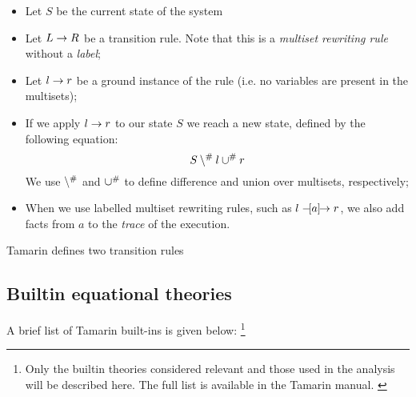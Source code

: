 \begin{itemize}
    \item{Let $S$ be the current state of the system}
    \item{Let $L \rightarrow R$ be a transition rule. Note that this is a \textit{multiset rewriting rule} without a \textit{label};}
    \item{Let $l \rightarrow r$ be a ground instance of the rule (i.e. no variables are present in the multisets);}
    \item{If we apply $l \rightarrow r$ to our state $S$ we reach a new state, defined by the following equation:
    \begin{equation}
        S \setminus^\# l \cup^\# r
    \end{equation}
    We use $\setminus^\#$ and $\cup^\#$ to define difference and union over multisets, respectively;}
    \item{When we use labelled multiset rewriting rules, such as $l \mathrel{-\hspace{-2pt}[a]\hspace{-4pt}\to} r$, we also add facts from $a$ to the \textit{trace} of the execution.}
\end{itemize}

Tamarin defines two transition rules


\subsection{Builtin equational theories}
\label{sub:Builtin-equational-theories}
A brief list of Tamarin built-ins is given below: \footnote{Only the builtin theories considered relevant and those used in the analysis will be described here. The full list is available in the Tamarin manual. \cite{TamarinProverManual}}

